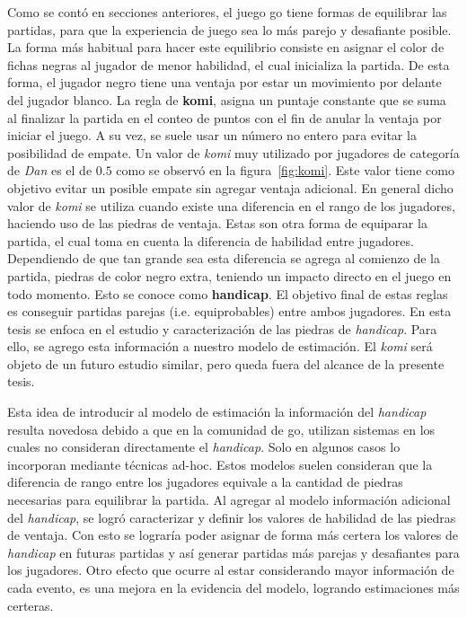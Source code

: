 \documentclass[11pt,twoside,spanish]{report} %
\begin{document}

Como se cont\'o en secciones anteriores, el juego go tiene formas de equilibrar las partidas, para que la experiencia de juego sea lo m\'as parejo y desafiante posible.
La forma m\'as habitual para hacer este equilibrio consiste en asignar el color de fichas negras al jugador de menor habilidad, el cual inicializa la partida.
De esta forma, el jugador negro tiene una ventaja por estar un movimiento por delante del jugador blanco.
La regla de \textbf{komi}, asigna un puntaje constante que se suma al finalizar la partida en el conteo de puntos con el fin de anular la ventaja por iniciar el juego.
A su vez, se suele usar un n\'umero no entero para evitar la posibilidad de empate.
Un valor de \emph{komi} muy utilizado por jugadores de categor\'ia de \textit{Dan} es el de $0.5$  como se observ\'o en la figura~\ref{fig:komi}.
Este valor tiene como objetivo evitar un posible empate sin agregar ventaja adicional.
En general dicho valor de \textit{komi} se utiliza cuando existe una diferencia en el rango de los jugadores, haciendo uso de las piedras de ventaja.
Estas son otra forma de equiparar la partida, el cual toma en cuenta la diferencia de habilidad entre jugadores.
Dependiendo de que tan grande sea esta diferencia se agrega al comienzo de la partida, piedras de color negro extra, teniendo un impacto directo en el juego en todo momento. 
Esto se conoce como \textbf{handicap}.
El objetivo final de estas reglas es conseguir partidas parejas (i.e. equiprobables) entre ambos jugadores.
En esta tesis se enfoca en el estudio y caracterizaci\'on de las piedras de \textit{handicap}.
Para ello, se agrego esta informaci\'on a nuestro modelo de estimaci\'on.
El \textit{komi} ser\'a objeto de un futuro estudio similar, pero queda fuera del alcance de la presente tesis.


Esta idea de introducir al modelo de estimaci\'on la informaci\'on del \textit{handicap} resulta novedosa debido a que en la comunidad de go, utilizan sistemas en los cuales no consideran directamente el \emph{handicap}.
Solo en algunos casos lo incorporan mediante t\'ecnicas ad-hoc.
Estos modelos suelen consideran que la diferencia de rango entre los jugadores equivale a la cantidad de piedras necesarias para equilibrar la partida.
Al agregar al modelo informaci\'on adicional del \textit{handicap}, se logr\'o caracterizar y definir los valores de habilidad de las piedras de ventaja.
Con esto se lograr\'ia poder asignar de forma m\'as certera los valores de \textit{handicap} en futuras partidas y as\'i generar partidas  m\'as parejas y desafiantes para los jugadores.
Otro efecto que ocurre al estar considerando mayor informaci\'on de cada evento, es una mejora en la evidencia del modelo, logrando estimaciones m\'as certeras.
\end{document}
